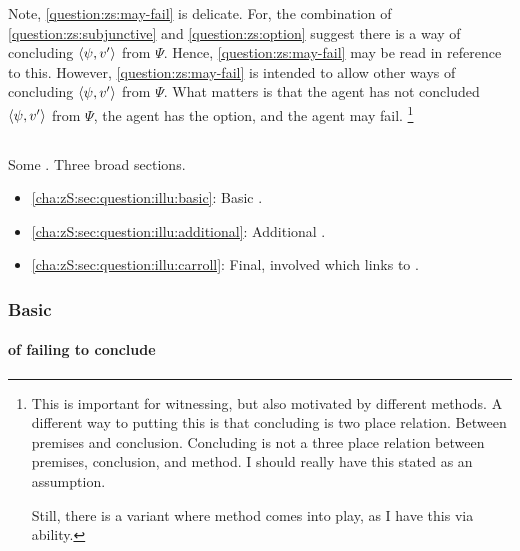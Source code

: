 {
  \color{red}
  Note, \ref{question:zs:may-fail} is delicate.
  For, the combination of \ref{question:zs:subjunctive} and \ref{question:zs:option} suggest there is a way of concluding \(\langle \psi, v' \rangle\) from \(\Psi\).
  Hence, \ref{question:zs:may-fail} may be read in reference to this.
  However, \ref{question:zs:may-fail} is intended to allow other ways of concluding \(\langle \psi, v' \rangle\) from \(\Psi\).
  What matters is that the agent has not concluded \(\langle \psi, v' \rangle\) from \(\Psi\), the agent has the option, and the agent may fail.%
  \footnote{
    This is important for witnessing, but also motivated by different methods.
    A different way to putting this is that concluding is two place relation.
    Between premises and conclusion.
    Concluding is not a three place relation between premises, conclusion, and method.
    I should really have this stated as an assumption.

    Still, there is a variant where method comes into play, as I have this via ability.
  }
}

\subsection{}
\label{cha:zS:sec:question:illu}

\begin{note}
  Some .
  Three broad sections.

  \begin{itemize}
  \item
    \autoref{cha:zS:sec:question:illu:basic}: Basic .
  \item
    \autoref{cha:zS:sec:question:illu:additional}: Additional .
  \item
    \autoref{cha:zS:sec:question:illu:carroll}: Final, involved  which links \qzS{} to \citeauthor{Carroll:1895uj}.
  \end{itemize}
\end{note}

\subsubsection{Basic }
\label{cha:zS:sec:question:illu:basic}

\paragraph{ of failing to conclude}

